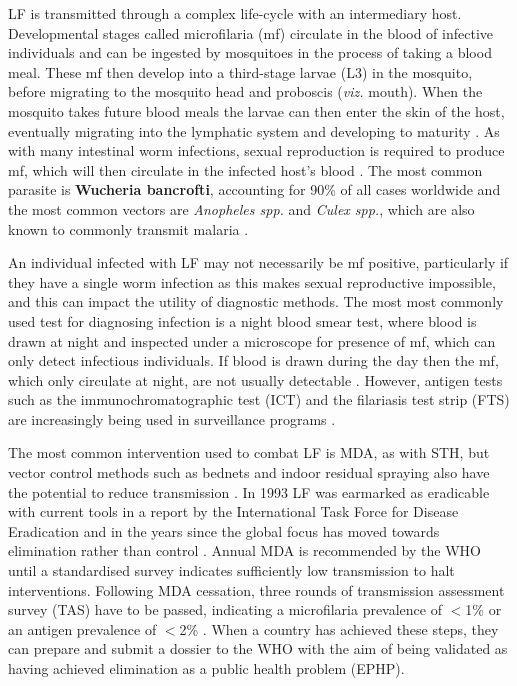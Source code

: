 LF is transmitted through a complex life-cycle with an intermediary host. Developmental stages called microfilaria (mf) circulate in the blood of infective individuals and can be ingested by mosquitoes in the process of taking a blood meal. These mf then develop into a third-stage larvae (L3) in the mosquito, before migrating to the mosquito head and proboscis (\textit{viz.} mouth). When the mosquito takes future blood meals the larvae can then enter the skin of the host, eventually migrating into the lymphatic system and developing to maturity \cite{WHOLF}. As with many intestinal worm infections, sexual reproduction is required to produce mf, which will then circulate in the infected host's blood \cite{WHO2019_FactSheet,Anderson1992}. The most common parasite is \textbf{Wucheria bancrofti}, accounting for 90\% of all cases worldwide and the most common vectors are \textit{Anopheles spp.} and \textit{Culex spp.}, which are also known to commonly transmit malaria \cite{WHO2019_FactSheet}.

An individual infected with LF may not necessarily be mf positive, particularly if they have a single worm infection as this makes sexual reproductive impossible, and this can impact the utility of diagnostic methods. The most most commonly used test for diagnosing infection is a night blood smear test, where blood is drawn at night and inspected under a microscope for presence of mf, which can only detect infectious individuals. If blood is drawn during the day then the mf, which only circulate at night, are not usually detectable \cite{WHO2019_FactSheet}. However, antigen tests such as the immunochromatographic test (ICT) and the filariasis test strip (FTS) are increasingly being used in surveillance programs \cite{weil1997,Chesnais2016}. 

The most common intervention used to combat LF is MDA, as with STH, but vector control methods such as bednets and indoor residual spraying also have the potential to reduce transmission \cite{WHO2017_GPELF,rebollo2015}. In 1993 LF was earmarked as eradicable with current tools in a report by the International Task Force for Disease Eradication and in the years since the global focus has moved towards elimination rather than control \cite{WHO2017_GPELF}. Annual MDA is recommended by the WHO until a standardised survey indicates sufficiently low transmission to halt interventions. Following MDA cessation, three rounds of transmission assessment survey (TAS) have to be passed, indicating a microfilaria prevalence of $<$1\% or an antigen prevalence of $<$2\% \cite{WHO2017_Validation}. When a country has achieved these steps, they can prepare and submit a dossier to the WHO with the aim of being validated as having achieved elimination as a public health problem (EPHP).

